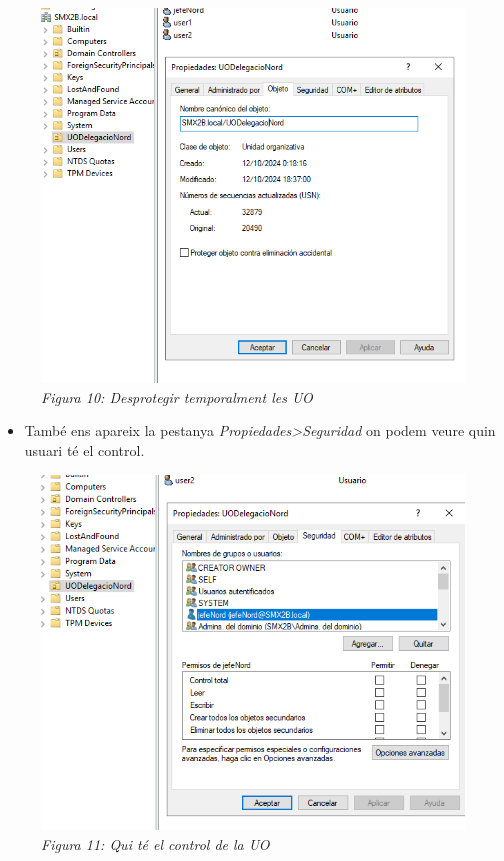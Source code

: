 \documentclass[
  a4paper,
]{article}
\providecommand{\tightlist}{%
  \setlength{\itemsep}{0pt}\setlength{\parskip}{0pt}}
\begin{document}
\begin{figure}
\centering
\includegraphics{png/protegerUO.png}
\caption{\emph{Figura 10: Desprotegir temporalment les UO}}
\end{figure}

\begin{itemize}
\tightlist
\item
  També ens apareix la pestanya \emph{Propiedades\textgreater Seguridad}
  on podem veure quin usuari té el control.
\end{itemize}

\begin{figure}
\centering
\includegraphics{png/seguridaddeUO.png}
\caption{\emph{Figura 11: Qui té el control de la UO}}
\end{figure}
\end{document}
